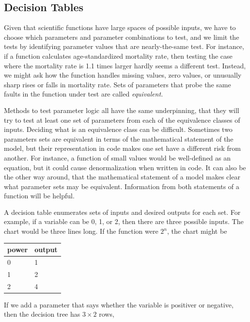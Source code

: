 \documentclass[fleqn,10pt]{olplainarticle}
\begin{document}
\subsection{Decision Tables}\label{sec:parameter-decision}

Given that scientific functions have large spaces of possible inputs,
we have to choose which parameters and parameter
combinations to test, and we limit the tests by identifying
parameter values that are nearly-the-same test. For instance,
if a function calculates age-standardized mortality rate, then testing
the case where the mortality rate is 1.1 times larger hardly seems
a different test. Instead, we might ask how the function handles
missing values, zero values, or unusually sharp rises or falls in
mortality rate. Sets of parameters that probe the same faults in
the function under test are called \emph{equivalent.}

Methods to test parameter logic all have the same underpinning,
that they will try to test at least one set of parameters from
each of the equivalence classes of inputs. Deciding what is an
equivalence class can be difficult. Sometimes two parameters
sets are equivalent in terms of the mathematical statement of 
the model, but their representation in code makes one set
have a different risk from another. For instance, a function of small
values would be well-defined as an equation, but it could cause
denormalization when written in code.
It can also be the other way around, that
the mathematical statement of a model makes clear what parameter
sets may be equivalent. Information from both statements of
a function will be helpful.

A decision table enumerates sets of inputs and desired outputs for each set.
For example, if a variable can be 0, 1, or 2, then there are three possible
inputs. The chart would be three lines long. If the function were $2^n$,
the chart might be

\begin{center}
\begin{tabular}{|l|l|}\hline
power & output \\ \hline
0 & 1 \\
1 & 2 \\
2 & 4 \\ \hline
\end{tabular}
\end{center}

If we add a parameter that says whether the variable is positiver or negative,
then the decision tree has $3\times 2$ rows,
\end{document}
